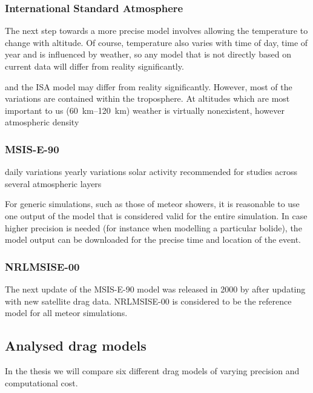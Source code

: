         \subsubsection{International Standard Atmosphere} \label{fddi}
            The next step towards a more precise model involves allowing the temperature to change with altitude.
            Of course, temperature also varies with time of day, time of year and is influenced by weather,
            so any model that is not directly based on current data will differ from reality significantly.

            and the ISA model may differ from reality significantly. However, most of the variations
            are contained within the troposphere. At altitudes which are most important to us
            (\SIrange{60}{120}{\kilo\metre}) weather is virtually nonexistent, however atmospheric
            density 



        \subsubsection{MSIS-E-90} \label{fdd9}
            daily variations
            yearly variations
            solar activity
            recommended for studies across several atmospheric layers \cite{...}

            For generic simulations, such as those of meteor showers,
            it is reasonable to use one output of the model that is considered valid for the entire simulation.
            In case higher precision is needed (for instance when modelling a particular bolide),
            the model output can be downloaded for the precise time and location of the event.

        \subsubsection{NRLMSISE-00} \label{fdd0}
            The next update of the MSIS-E-90 model was released in 2000 by \citet{picone+nrlmsise00}
            after updating with new satellite drag data. NRLMSISE-00 is considered to be
            the reference model for all meteor simulations.

    \subsection{Analysed drag models} \label{fdm}
        In the thesis we will compare six different drag models of varying precision
        and computational cost.

